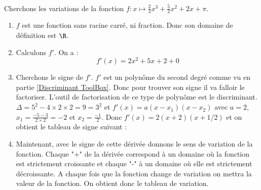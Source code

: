\documentclass[12pt,fleqn]{report} %
\begin{document}
\begin{example}\text{ }\\
	Cherchons les variations de la fonction $f : x \mapsto \frac{2}{3}x^3 + \frac{5}{2}x^2 + 2x + \pi$.
	\begin{enumerate}
		\item $f$ est une fonction sans racine carré, ni fraction. Donc son domaine de définition est $\R$.
		\item Calculons $f'$. On a :\[
		f'(x) = 2 x^2 + 5x + 2 + 0
		\]
		\item Cherchons le signe de $f'$. $f'$ est un polynôme du second degré comme vu en partie \ref{Discriminant ToolBox}. Donc pour trouver son signe il va falloir le factoriser. L'outil de factorisation de ce type de polynôme est le discriminant. \\
		$ \Delta = 5^2 - 4\times 2\times 2 = 9 = 3^2$ et $f'(x) = a (x - x_1)(x-x_2)$ avec $a = 2$, $x_1 = \frac{-5 - 3}{2\times 2} = -2$ et $x_2 = \frac{-1}{2}$. Donc $f'(x) = 2(x + 2)(x + 1/2)$ et on obtient le tableau de signe suivant : 
		\begin{center}
		\end{center}
		
		\item Maintenant, avec le signe de cette dérivée donnons le sens de variation de la fonction. Chaque "+" de la dérivée correspond à un domaine où la fonction est strictement croissante et chaque "-" à un domaine où elle est strictement décroissante. A chaque fois que la fonction change de variation on mettra la valeur de la fonction. On obtient donc le tableau de variation.
		
		\begin{center}
		\end{center}
		
	\end{enumerate}
\end{example}
\end{document}
